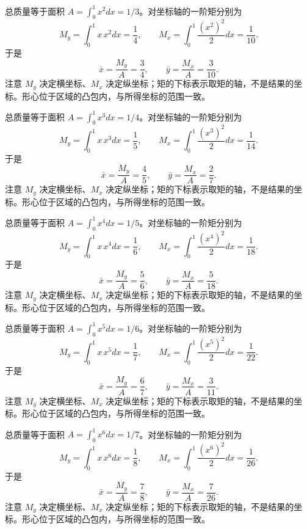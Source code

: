 \documentclass[12pt,fontset=fandol]{ctexart}
\begin{document}
\begin{solve}\label{ans:c21q14}
总质量等于面积 $A=\int_0^1x^{2}dx=1/3$。对坐标轴的一阶矩分别为
\[
M_y=\int_0^1x\,x^{2}dx=\frac1{4},\qquad M_x=\int_0^1\frac{(x^{2})^2}2dx=\frac1{10}.
\]
于是
\[
\bar x=\frac{M_y}A=\frac{3}{4},\qquad\bar y=\frac{M_x}A=\frac{3}{10}.
\]
注意 $M_y$ 决定横坐标、$M_x$ 决定纵坐标；矩的下标表示取矩的轴，不是结果的坐标。形心位于区域的凸包内，与所得坐标的范围一致。
\end{solve}

\begin{solve}\label{ans:c21q15}
总质量等于面积 $A=\int_0^1x^{3}dx=1/4$。对坐标轴的一阶矩分别为
\[
M_y=\int_0^1x\,x^{3}dx=\frac1{5},\qquad M_x=\int_0^1\frac{(x^{3})^2}2dx=\frac1{14}.
\]
于是
\[
\bar x=\frac{M_y}A=\frac{4}{5},\qquad\bar y=\frac{M_x}A=\frac{2}{7}.
\]
注意 $M_y$ 决定横坐标、$M_x$ 决定纵坐标；矩的下标表示取矩的轴，不是结果的坐标。形心位于区域的凸包内，与所得坐标的范围一致。
\end{solve}

\begin{solve}\label{ans:c21q16}
总质量等于面积 $A=\int_0^1x^{4}dx=1/5$。对坐标轴的一阶矩分别为
\[
M_y=\int_0^1x\,x^{4}dx=\frac1{6},\qquad M_x=\int_0^1\frac{(x^{4})^2}2dx=\frac1{18}.
\]
于是
\[
\bar x=\frac{M_y}A=\frac{5}{6},\qquad\bar y=\frac{M_x}A=\frac{5}{18}.
\]
注意 $M_y$ 决定横坐标、$M_x$ 决定纵坐标；矩的下标表示取矩的轴，不是结果的坐标。形心位于区域的凸包内，与所得坐标的范围一致。
\end{solve}

\begin{solve}\label{ans:c21q17}
总质量等于面积 $A=\int_0^1x^{5}dx=1/6$。对坐标轴的一阶矩分别为
\[
M_y=\int_0^1x\,x^{5}dx=\frac1{7},\qquad M_x=\int_0^1\frac{(x^{5})^2}2dx=\frac1{22}.
\]
于是
\[
\bar x=\frac{M_y}A=\frac{6}{7},\qquad\bar y=\frac{M_x}A=\frac{3}{11}.
\]
注意 $M_y$ 决定横坐标、$M_x$ 决定纵坐标；矩的下标表示取矩的轴，不是结果的坐标。形心位于区域的凸包内，与所得坐标的范围一致。
\end{solve}

\begin{solve}\label{ans:c21q18}
总质量等于面积 $A=\int_0^1x^{6}dx=1/7$。对坐标轴的一阶矩分别为
\[
M_y=\int_0^1x\,x^{6}dx=\frac1{8},\qquad M_x=\int_0^1\frac{(x^{6})^2}2dx=\frac1{26}.
\]
于是
\[
\bar x=\frac{M_y}A=\frac{7}{8},\qquad\bar y=\frac{M_x}A=\frac{7}{26}.
\]
注意 $M_y$ 决定横坐标、$M_x$ 决定纵坐标；矩的下标表示取矩的轴，不是结果的坐标。形心位于区域的凸包内，与所得坐标的范围一致。
\end{solve}
\end{document}
